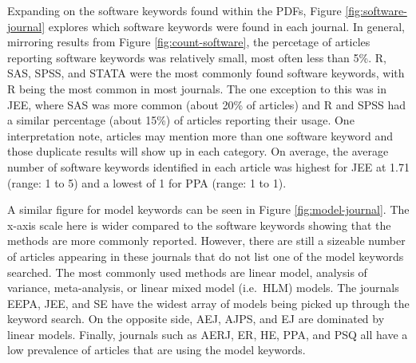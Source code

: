 \documentclass[english,,man]{apa6}
\theoremstyle{definition}
\theoremstyle{definition}
\theoremstyle{definition}
\theoremstyle{remark}
\begin{document}
Expanding on the software keywords found within the PDFs, Figure
\ref{fig:software-journal} explores which software keywords were found
in each journal. In general, mirroring results from Figure
\ref{fig:count-software}, the percetage of articles reporting software
keywords was relatively small, most often less than 5\%. R, SAS, SPSS,
and STATA were the most commonly found software keywords, with R being
the most common in most journals. The one exception to this was in JEE,
where SAS was more common (about 20\% of articles) and R and SPSS had a
similar percentage (about 15\%) of articles reporting their usage. One
interpretation note, articles may mention more than one software keyword
and those duplicate results will show up in each category. On average,
the average number of software keywords identified in each article was
highest for JEE at 1.71 (range: 1 to 5) and a lowest of 1 for PPA
(range: 1 to 1).

A similar figure for model keywords can be seen in Figure
\ref{fig:model-journal}. The x-axis scale here is wider compared to the
software keywords showing that the methods are more commonly reported.
However, there are still a sizeable number of articles appearing in
these journals that do not list one of the model keywords searched. The
most commonly used methods are linear model, analysis of variance,
meta-analysis, or linear mixed model (i.e.~HLM) models. The journals
EEPA, JEE, and SE have the widest array of models being picked up
through the keyword search. On the opposite side, AEJ, AJPS, and EJ are
dominated by linear models. Finally, journals such as AERJ, ER, HE, PPA,
and PSQ all have a low prevalence of articles that are using the model
keywords.
\end{document}
